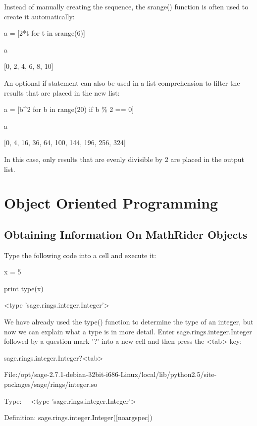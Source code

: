\documentclass[12pt,oneside]{book}
\begin{document}
Instead of manually creating the sequence, the srange() function is often used to create it automatically: 

a = [2*t for t in srange(6)]

a

{\textbar}

[0, 2, 4, 6, 8, 10]

An optional if statement can also be used in a list comprehension to filter the results that are placed in the new list: 

a = [b\^{}2 for b in range(20) if b \% 2 == 0]

a

{\textbar}

[0, 4, 16, 36, 64, 100, 144, 196, 256, 324]

In this case, only results that are evenly divisible by 2 are placed in the output list. 
\chapter[Object Oriented Programming]{Object Oriented Programming}

\section[Obtaining Information On MathRider Objects]{Obtaining Information On MathRider Objects}

Type the following code into a cell and execute it:


x = 5

print type(x)

{\textbar}

{\textless}type 'sage.rings.integer.Integer'{\textgreater}


We have already used the type() function to determine the type of an integer, but now we can explain what a type is in more detail. Enter sage.rings.integer.Integer followed by a question mark '?' into a new cell and then press the {\textless}tab{\textgreater} key: 

sage.rings.integer.Integer?{\textless}tab{\textgreater}

{\textbar}

File:/opt/sage{}-2.7.1{}-debian{}-32bit{}-i686{}-Linux/local/lib/python2.5/site{}-packages/sage/rings/integer.so


Type: \ \ {\textless}type
'sage.rings.integer.Integer'{\textgreater}


Definition: sage.rings.integer.Integer([noargspec]) 
\end{document}
